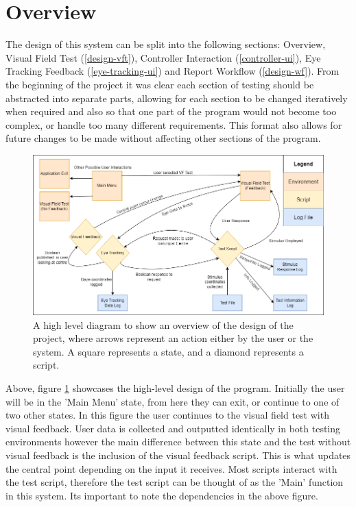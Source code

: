 \documentclass{l4proj}
\begin{document}
\section{Overview} \label{design_overview}
The design of this system can be split into the following sections: Overview, Visual Field Test (\ref{design-vft}), Controller Interaction (\ref{controller-ui}), Eye Tracking Feedback (\ref{eye-tracking-ui}) and Report Workflow (\ref{design-wf}). From the beginning of the project it was clear each section of testing should be abstracted into separate parts, allowing for each section to be changed iteratively when required and also so that one part of the program would not become too complex, or handle too many different requirements. This format also allows for future changes to be made without affecting other sections of the program.
\begin{figure}[htbp]
    \centering
    \includegraphics[width=1\linewidth]{dissertation/images/Design_Overview.png}    

    \caption{A high level diagram to show an overview of the design of the project, where arrows represent an action either by the user or the system. A square represents a state, and a diamond represents a script. 
    }
    \label{fig:Design_Overview} 
\end{figure}
\newline
Above, figure \ref{fig:Design_Overview} showcases the high-level design of the program. Initially the user will be in the 'Main Menu' state, from here they can exit, or continue to one of two other states. In this figure the user continues to the visual field test with visual feedback. User data is collected and outputted identically in both testing environments however the main difference between this state and the test without visual feedback is the inclusion of the visual feedback script. This is what updates the central point depending on the input it receives. Most scripts interact with the test script, therefore the test script can be thought of as the 'Main' function in this system. Its important to note the dependencies in the above figure. 
\end{document}
